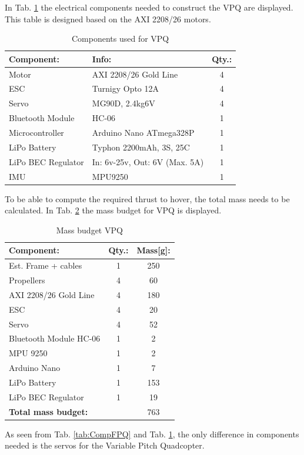 \noindent
In Tab. \ref{tab:CompVPQ} the electrical components needed to construct the VPQ are displayed. This table is designed based on the AXI 2208/26 motors. 
\begin{table}[H]
    \begin{center}
    \caption{Components used for VPQ} 
    \label{tab:CompVPQ} 
        \begin{tabular}{|l|l|c|}
            \hline 
            \textbf{Component:} & \textbf{Info:} & \textbf{Qty.:}  \\ 
            \hline
            Motor & AXI 2208/26 Gold Line & 4 \\
            ESC & Turnigy Opto 12A & 4 \\
            Servo & MG90D, 2.4kg\@6V & 4  \\ 
            Bluetooth Module & HC-06 & 1  \\
            Microcontroller & Arduino Nano  ATmega328P& 1 \\
            LiPo Battery & Typhon 2200mAh, 3S, 25C & 1 \\
            LiPo BEC Regulator & In: 6v-25v, Out: 6V (Max. 5A)  & 1\\
            IMU & MPU9250 & 1 \\
            \hline
        \end{tabular}
    \end{center}
\end{table}
\noindent
To be able to compute the required thrust to hover, the total mass needs to be calculated. In Tab. \ref{tab:WeightVPQ} the mass budget for VPQ is displayed.
\begin{table}[H]
    \begin{center}
    \caption{Mass budget VPQ} 
    \label{tab:WeightVPQ} 
        \begin{tabular}{|l|c|c|}
            \hline 
            \textbf{Component:} & \textbf{Qty.:} & \textbf{Mass[g]:}  \\ \hline
            Est. Frame + cables & 1 & 250\\
            Propellers & 4 & 60\\
            AXI 2208/26 Gold Line  & 4 & 180 \\
            ESC & 4 & 20\\
            Servo & 4 & 52 \\
            Bluetooth Module HC-06 & 1 & 2\\
            MPU 9250 & 1 & 2 \\
            Arduino Nano & 1 & 7 \\
            LiPo Battery & 1 & 153 \\
            LiPo BEC Regulator & 1 & 19 \\\hline
            \textbf{Total mass budget:} & & 763 \\
            \hline
        \end{tabular}
    \end{center}
\end{table}
\noindent
As seen from Tab. \ref{tab:CompFPQ} and Tab. \ref{tab:CompVPQ}, the only difference in components needed is the servos for the Variable Pitch Quadcopter. 

\newpage
